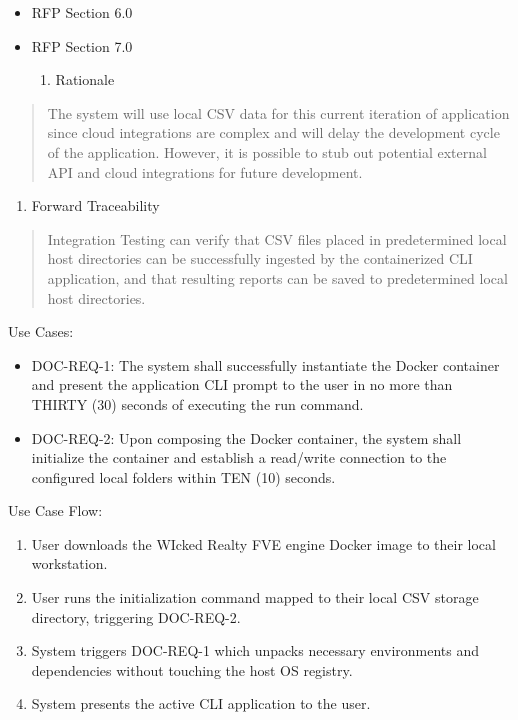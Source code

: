 \documentclass[
]{article}
\begin{document}
\begin{itemize}
\item
  RFP Section 6.0
\item
  RFP Section 7.0

  \begin{enumerate}
  \def\labelenumi{\roman{enumi}.}
  \item
    Rationale
  \end{enumerate}
\end{itemize}

\begin{quote}
The system will use local CSV data for this current iteration of
application since cloud integrations are complex and will delay the
development cycle of the application. However, it is possible to stub
out potential external API and cloud integrations for future
development.
\end{quote}

\begin{enumerate}
\def\labelenumi{\alph{enumi}.}
\item
  Forward Traceability
\end{enumerate}

\begin{quote}
Integration Testing can verify that CSV files placed in predetermined
local host directories can be successfully ingested by the containerized
CLI application, and that resulting reports can be saved to
predetermined local host directories.
\end{quote}

Use Cases:

\begin{itemize}
\item
  DOC-REQ-1: The system shall successfully instantiate the Docker
  container and present the application CLI prompt to the user in no
  more than THIRTY (30) seconds of executing the run command.
\item
  DOC-REQ-2: Upon composing the Docker container, the system shall
  initialize the container and establish a read/write connection to the
  configured local folders within TEN (10) seconds.
\end{itemize}

Use Case Flow:

\begin{enumerate}
\def\labelenumi{\arabic{enumi}.}
\item
  User downloads the WIcked Realty FVE engine Docker image to their
  local workstation.
\item
  User runs the initialization command mapped to their local CSV storage
  directory, triggering DOC-REQ-2.
\item
  System triggers DOC-REQ-1 which unpacks necessary environments and
  dependencies without touching the host OS registry.
\item
  System presents the active CLI application to the user.
\end{enumerate}
\end{document}
